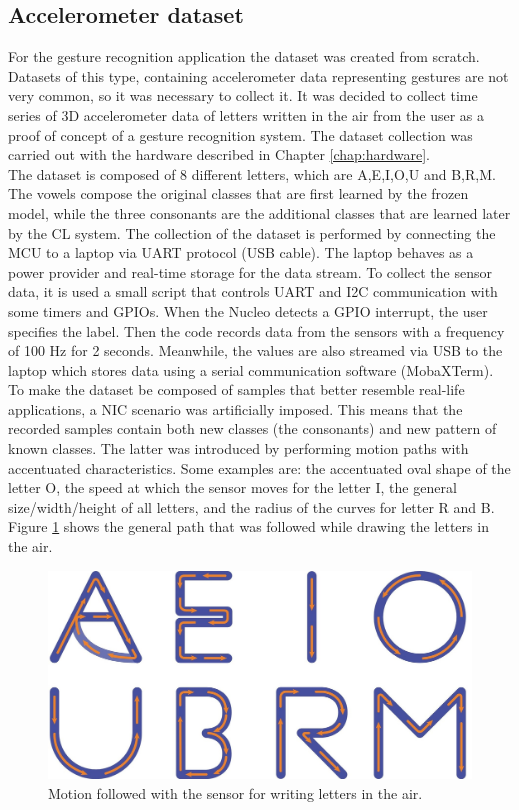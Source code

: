 \documentclass[12pt]{report}
\begin{document}
\subsection{Accelerometer dataset}
For the gesture recognition application the dataset was created from scratch. Datasets of this type, containing accelerometer data representing gestures are not very common, so it was necessary to collect it. It was decided to collect time series of 3D accelerometer data of letters written in the air from the user as a proof of concept of a gesture recognition system.
The dataset collection was carried out with the hardware described in Chapter \ref{chap:hardware}. \\
The dataset is composed of 8 different letters, which are A,E,I,O,U and B,R,M. The vowels compose the original classes that are first learned by the frozen model, while the three consonants are the additional classes that are learned later by the CL system. The collection of the dataset is performed by connecting the MCU to a laptop via UART protocol (USB cable). The laptop behaves as a power provider and real-time storage for the data stream. 
To collect the sensor data, it is used a small script that controls UART and I2C communication with some timers and GPIOs. When the Nucleo detects a GPIO interrupt, the user specifies the label. Then the code records data from the sensors with a frequency of 100 Hz for 2 seconds. Meanwhile, the values are also streamed via USB to the laptop which stores data using a serial communication software (MobaXTerm). \\
To make the dataset be composed of samples that better resemble real-life applications, a NIC scenario was artificially imposed. This means that the recorded samples contain both new classes (the consonants) and new pattern of known classes. The latter was introduced by performing motion paths with accentuated characteristics. Some examples are: the accentuated oval shape of the letter O, the speed at which the sensor moves for the letter I, the general size/width/height of all letters, and the radius of the curves for letter R and B.
Figure \ref{fig:letters_motion} shows the general path that was followed while drawing the letters in the air.\\

\begin{figure}[h!]
    \centering
    \includegraphics[width=120mm]{Figures/Chapter4/letters_motion.jpg} 
    \caption{Motion followed with the sensor for writing letters in the air.}
    \label{fig:letters_motion}    
\end{figure}
\end{document}
